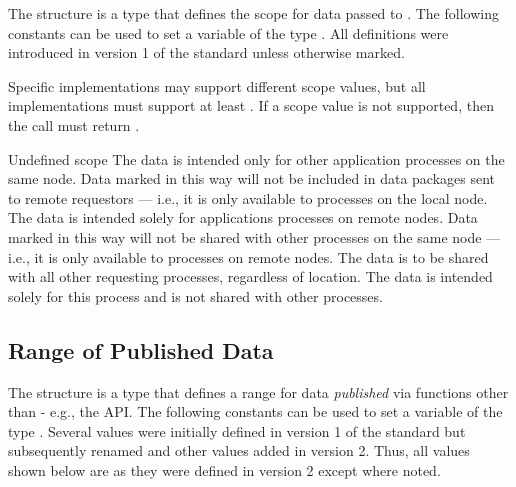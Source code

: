 The  structure is a  type that defines the scope for data passed to .
The following constants can be used to set a variable of the type . All definitions were introduced in version 1 of the standard unless otherwise marked.

Specific implementations may support different scope values, but all implementations must support at least .
If a scope value is not supported, then the  call must return .

\begin{constantdesc}
%
Undefined scope
%
The data is intended only for other application processes on the same node.
Data marked in this way will not be included in data packages sent to remote requestors --- i.e., it is only available to processes on the local node.
%
The data is intended solely for applications processes on remote nodes.
Data marked in this way will not be shared with other processes on the same node --- i.e., it is only available to  processes on remote nodes.
%
The data is to be shared with all other requesting processes, regardless of location.
%
The data is intended solely for this process and is not shared with other processes.
%
\end{constantdesc}



\subsection{Range of Published Data}

The  structure is a  type that defines a range for data \textit{published} via functions other than  - e.g., the  \ac{API}.
The following constants can be used to set a variable of the type . Several values were initially defined in version 1 of the standard but subsequently renamed and other values added in version 2. Thus, all values shown below are as they were defined in version 2 except where noted.


